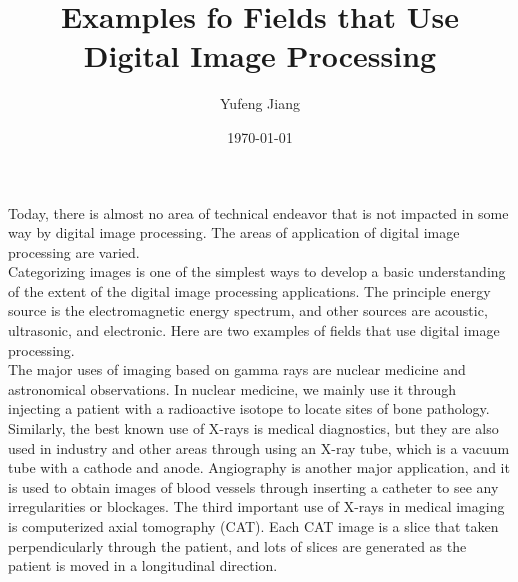 \documentclass[11pt,oneside]{article}
\title{Examples fo Fields that Use Digital Image Processing}
\author{Yufeng Jiang}
\date{\today}
\begin{document}
\maketitle
Today, there is almost no area of technical endeavor that is not impacted in some way by digital image processing. The areas of application of digital image processing are varied. \\
\indent Categorizing images is one of the simplest ways to develop a basic understanding of the extent of the digital image processing applications. The principle energy source is the electromagnetic energy spectrum, and other sources are acoustic, ultrasonic, and electronic. Here are two examples of fields that use digital image processing.\\
\indent The major uses of imaging based on gamma rays are nuclear medicine and astronomical observations. In nuclear medicine, we mainly use it through injecting a patient with a radioactive isotope to locate sites of bone pathology. Similarly, the best known use of X-rays is medical diagnostics, but they are also used in industry and other areas through using an X-ray tube, which is a vacuum tube with a cathode and anode. Angiography is another major application, and it is used to obtain images of blood vessels through inserting a catheter to see any irregularities or blockages. The third important use of X-rays in medical imaging is computerized axial tomography (CAT). Each CAT image is a slice that taken perpendicularly through the patient, and lots of slices are generated as the patient is moved in a longitudinal direction.
\end{document}
